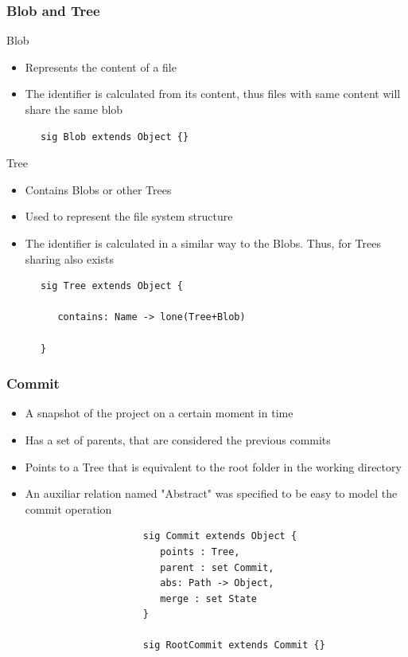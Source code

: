 \documentclass{beamer}
\begin{document}
\begin{frame}[fragile]
   \frametitle{Blob and Tree}
   \begin{block}{Blob}
      \begin{itemize}
         \item Represents the content of a file
         \item The identifier is calculated from its content, thus files with
	 same content will share the same blob
      \end{itemize}
      \tiny
      \color{blue}
      \begin{lstlisting}
      sig Blob extends Object {}
      \end{lstlisting}
   \end{block}
   \begin{block}{Tree}
      \begin{itemize}
         \item Contains Blobs or other Trees 
         \item Used to represent the file system structure
	 \item The identifier is calculated in a similar way to the Blobs. Thus, 
	 for Trees sharing also exists
      \end{itemize}
      \tiny
      \color{blue}
      \begin{lstlisting}
      sig Tree extends Object {
         
         contains: Name -> lone(Tree+Blob)
      
      }
      \end{lstlisting}
   \end{block}
\end{frame}




\begin{frame}[fragile]
   \frametitle{Commit}
   \begin{itemize}
      	\item A snapshot of the project on a certain moment
      in time
      	\item Has a set of parents, that are considered the previous commits 
	\item Points to a Tree that is equivalent to the root folder in the
	working directory
	\item An auxiliar relation named "Abstract" was specified to be easy to
	model the commit operation
   \end{itemize}
   \tiny
   \color{blue}
   \begin{lstlisting}
                        sig Commit extends Object {
                           points : Tree,
                           parent : set Commit,
                           abs: Path -> Object,
                           merge : set State
                        }
                           
                        sig RootCommit extends Commit {}
\end{lstlisting}
\end{frame}
\end{document}
